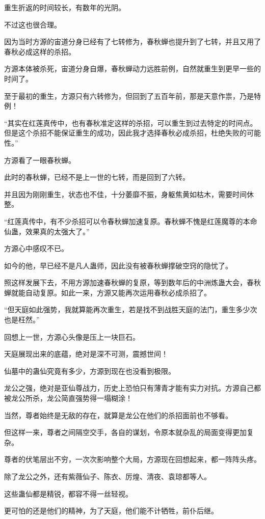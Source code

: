 \begin{this_body}
重生折返的时间较长，有数年的光阴。

不过这也很合理。

因为当时方源的宙道分身已经有了七转修为，春秋蝉也提升到了七转，并且又用了春秋必成这样的杀招。

方源本体被杀死，宙道分身自爆，春秋蝉动力远胜前例，自然就重生到更早一些的时间了。

至于最初的重生，方源只有六转修为，但回到了五百年前，那是天意作祟，乃是特例！

“其实在红莲真传中，也有春秋准定这样的杀招，可以重生到过去特定的时间点。但是这个杀招不能保证重生的成功，因此我才选择春秋必成杀招，杜绝失败的可能性。”

方源看了一眼春秋蝉。

此时的春秋蝉，已经不是上一世的七转，而是回到了六转。

并且因为刚刚重生，状态也不佳，十分萎靡不振，身躯焦黄如枯木，需要时间休整。

“红莲真传中，有不少杀招可以令春秋蝉加速复原。春秋蝉不愧是红莲魔尊的本命仙蛊，效果真的太强大了。”

方源心中感叹不已。

如今的他，早已经不是凡人蛊师，因此没有被春秋蝉撑破空窍的隐忧了。

照这样发展下去，不用方源加速春秋蝉的复原，等到数年后的中洲炼蛊大会，春秋蝉就能自动复原。如此一来，方源又能再次运用春秋必成杀招了。

“但天庭如此强势，我就算能再次重生，若是找不到战胜天庭的法门，重生多少次也是枉然。”

回想上一世，方源心头像是压上一块巨石。

天庭展现出来的底蕴，绝对是深不可测，震撼世间！

仙墓中的蛊仙究竟有多少，方源到现在也没看到极限。

龙公之强，绝对是亚仙尊战力，历史上恐怕只有薄青才能有实力对抗。方源自己都被龙公所杀，龙公简直强势得一塌糊涂！

当然，尊者始终是无敌的存在，就算是龙公在他们的杀招面前也不够看。

但这样一来，尊者之间隔空交手，各自的谋划，令原本就杂乱的局面变得更加复杂。

尊者的伏笔层出不穷，一次次影响整个大局，方源现在回想起来，都一阵阵头疼。

除了龙公之外，还有紫薇仙子、陈衣、厉煌、清夜、袁琼都等人。

这些蛊仙都是精锐，都容不得一丝轻视。

更可怕的还是他们的精神，为了天庭，他们能不计牺牲，前仆后继。


\end{this_body}
